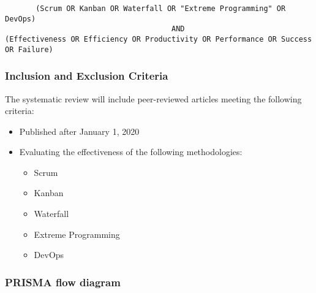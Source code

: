 \documentclass[12pt]{article}
\begin{document}
\begin{adjustwidth}{-4em}{0pt}
\begin{verbatim}
       (Scrum OR Kanban OR Waterfall OR "Extreme Programming" OR DevOps) 
                                      AND
(Effectiveness OR Efficiency OR Productivity OR Performance OR Success OR Failure)
\end{verbatim}
\end{adjustwidth}

\subsubsection{Inclusion and Exclusion Criteria}
The systematic review will include peer-reviewed articles meeting the following criteria:
\begin{itemize}
  \item Published after January 1, 2020
  \item Evaluating the effectiveness of the following methodologies:
  \begin{itemize}
    \item Scrum
    \item Kanban
    \item Waterfall
    \item Extreme Programming
    \item DevOps
  \end{itemize}
\end{itemize}


\subsubsection{PRISMA flow diagram}
\end{document}
